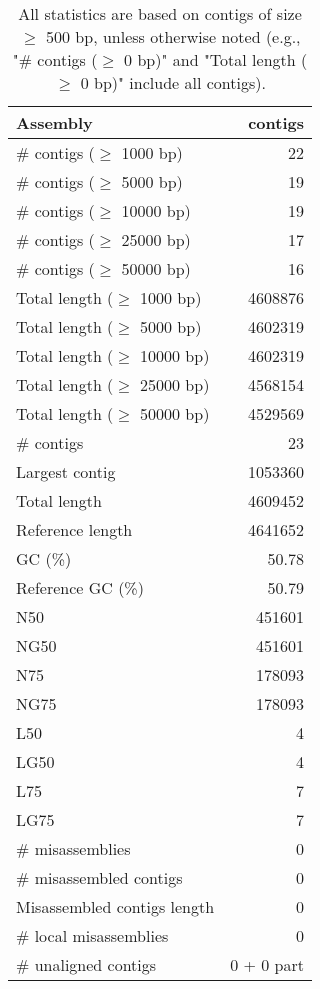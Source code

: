 \documentclass[12pt,a4paper]{article}
\begin{document}
\begin{table}[ht]
\begin{center}
\caption{All statistics are based on contigs of size $\geq$ 500 bp, unless otherwise noted (e.g., "\# contigs ($\geq$ 0 bp)" and "Total length ($\geq$ 0 bp)" include all contigs).}
\begin{tabular}{|l*{1}{|r}|}
\hline
Assembly & contigs \\ \hline
\# contigs ($\geq$ 1000 bp) & 22 \\ \hline
\# contigs ($\geq$ 5000 bp) & 19 \\ \hline
\# contigs ($\geq$ 10000 bp) & 19 \\ \hline
\# contigs ($\geq$ 25000 bp) & 17 \\ \hline
\# contigs ($\geq$ 50000 bp) & 16 \\ \hline
Total length ($\geq$ 1000 bp) & 4608876 \\ \hline
Total length ($\geq$ 5000 bp) & 4602319 \\ \hline
Total length ($\geq$ 10000 bp) & 4602319 \\ \hline
Total length ($\geq$ 25000 bp) & 4568154 \\ \hline
Total length ($\geq$ 50000 bp) & 4529569 \\ \hline
\# contigs & 23 \\ \hline
Largest contig & 1053360 \\ \hline
Total length & 4609452 \\ \hline
Reference length & 4641652 \\ \hline
GC (\%) & 50.78 \\ \hline
Reference GC (\%) & 50.79 \\ \hline
N50 & 451601 \\ \hline
NG50 & 451601 \\ \hline
N75 & 178093 \\ \hline
NG75 & 178093 \\ \hline
L50 & 4 \\ \hline
LG50 & 4 \\ \hline
L75 & 7 \\ \hline
LG75 & 7 \\ \hline
\# misassemblies & 0 \\ \hline
\# misassembled contigs & 0 \\ \hline
Misassembled contigs length & 0 \\ \hline
\# local misassemblies & 0 \\ \hline
\# unaligned contigs & 0 + 0 part \\ \hline

\end{tabular}
\end{center}
\end{table}
\end{document}
